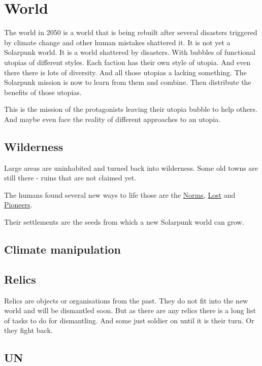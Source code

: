 \chapter{World}

The world in 2050 is a world that is being rebuilt after several disasters triggered by climate change and other human mistakes shattered it. It is not yet  a Solarpunk world. It is a world shattered by disasters. With bubbles of functional utopias of different styles.
Each faction has their own style of utopia. And even there there is lots of diversity.
And all those utopias a lacking something. The Solarpunk mission is now to learn from them and combine. Then distribute the benefits of those utopias.

This is the mission of the protagonists leaving their utopia bubble to help others. And maybe even face the reality of different approaches to an utopia.

\section{Wilderness}

Large areas are uninhabited and turned back into wilderness. Some old towns are still there - ruins that are not claimed yet.

The humans found several new ways to life those are the \hyperref[sec:Norms]{Norms}, \hyperref[sec:Lost]{Lost} and \hyperref[sec:Pioneers]{Pioneers}.

Their settlements are the seeds from which a new Solarpunk world can grow.

\section{Climate manipulation}

\section{Relics}
\label{sec: Relic}
Relics are objects or organisations from the past. They do not fit into the new world and will be dismantled soon. But as there are any relics there is a long list of tasks to do for dismantling. And some just soldier on until it is their turn. Or they fight back.

\section{UN}
\label{sec: UN}

